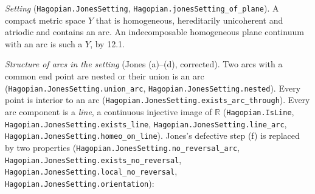 \documentclass[11pt]{article}
\newcommand{\lean}[1]{\texttt{#1}}
\begin{document}
\emph{Setting} (\lean{Hagopian.\hspace{0pt}JonesSetting}, \lean{Hagopian.\hspace{0pt}jonesSetting\_\hspace{0pt}of\_\hspace{0pt}plane}). A compact metric space $Y$ that is homogeneous, hereditarily unicoherent and atriodic and contains an arc. An indecomposable homogeneous plane continuum with an arc is such a $Y$, by 12.1.

\emph{Structure of arcs in the setting} (Jones (a)--(d), corrected). Two arcs with a common end point are nested or their union is an arc (\lean{Hagopian.\hspace{0pt}JonesSetting.\hspace{0pt}union\_\hspace{0pt}arc}, \lean{Hagopian.\hspace{0pt}JonesSetting.\hspace{0pt}nested}). Every point is interior to an arc (\lean{Hagopian.\hspace{0pt}JonesSetting.\hspace{0pt}exists\_\hspace{0pt}arc\_\hspace{0pt}through}). Every arc component is a \emph{line}, a continuous injective image of $\mathbb{R}$ (\lean{Hagopian.\hspace{0pt}IsLine}, \lean{Hagopian.\hspace{0pt}JonesSetting.\hspace{0pt}exists\_\hspace{0pt}line}, \lean{Hagopian.\hspace{0pt}JonesSetting.\hspace{0pt}line\_\hspace{0pt}arc}, \lean{Hagopian.\hspace{0pt}JonesSetting.\hspace{0pt}homeo\_\hspace{0pt}on\_\hspace{0pt}line}). Jones's defective step (f) is replaced by two properties (\lean{Hagopian.\hspace{0pt}JonesSetting.\hspace{0pt}no\_\hspace{0pt}reversal\_\hspace{0pt}arc}, \lean{Hagopian.\hspace{0pt}JonesSetting.\hspace{0pt}exists\_\hspace{0pt}no\_\hspace{0pt}reversal}, \lean{Hagopian.\hspace{0pt}JonesSetting.\hspace{0pt}local\_\hspace{0pt}no\_\hspace{0pt}reversal}, \lean{Hagopian.\hspace{0pt}JonesSetting.\hspace{0pt}orientation}):
\end{document}

